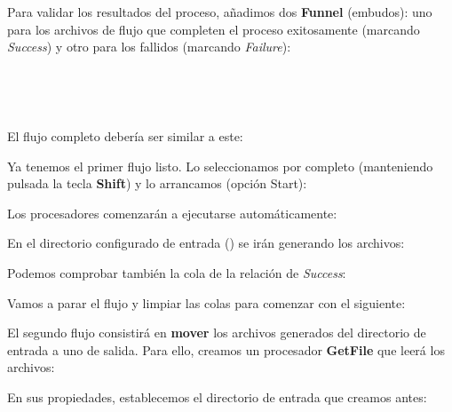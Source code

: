 \documentclass{../../../miPlantilla}
\begin{document}

Para validar los resultados del proceso, añadimos dos \textbf{Funnel} (embudos): uno para los archivos de flujo que completen el proceso exitosamente (marcando \textit{Success}) y otro para los fallidos (marcando \textit{Failure}):

\begin{figure}[H]
    \centering
    \begin{minipage}{0.1\textwidth}  %
    \end{minipage}\hfill
    \begin{minipage}{0.8\textwidth}   %
    \end{minipage}
\end{figure}

\newpage

El flujo completo debería ser similar a este:


Ya tenemos el primer flujo listo. Lo seleccionamos por completo (manteniendo pulsada la tecla \textbf{Shift}) y lo arrancamos (opción Start):


Los procesadores comenzarán a ejecutarse automáticamente:


En el directorio configurado de entrada () se irán generando los archivos:


\newpage

Podemos comprobar también la cola de la relación de \textit{Success}:


Vamos a parar el flujo y limpiar las colas para comenzar con el siguiente:


El segundo flujo consistirá en \textbf{mover} los archivos generados del directorio de entrada a uno de salida. Para ello, creamos un procesador \textbf{GetFile} que leerá los archivos:


\newpage

En sus propiedades, establecemos el directorio de entrada que creamos antes:

\end{document}
